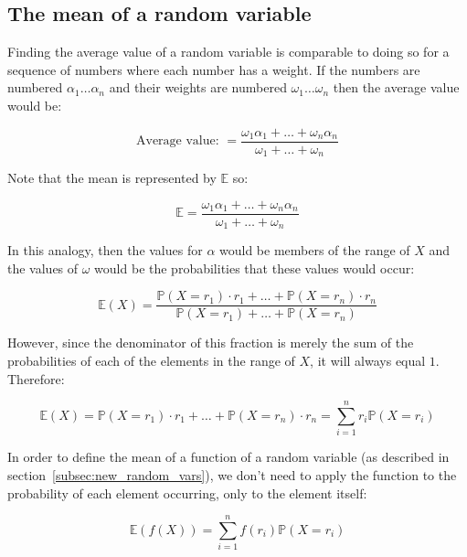 \subsection{The mean of a random variable}

Finding the average value of a random variable is comparable to doing so for a
sequence of numbers where each number has a weight. If the numbers are numbered
$\alpha_1 \dots \alpha_n$ and their weights are numbered $\omega_1 \dots
\omega_n$ then the average value would be:

\begin{dmath}
	\textrm{Average value: } = \frac{\omega_1\alpha_1 + \dots + \omega_n\alpha_n}{\omega_1 + \dots + \omega_n}
\end{dmath}

Note that the mean is represented by $\mathbb{E}$ so:

\begin{dmath}
	\mathbb{E} = \frac{\omega_1\alpha_1 + \dots + \omega_n\alpha_n}{\omega_1 + \dots + \omega_n}
\end{dmath}

In this analogy, then the values for $\alpha$ would be members of the range of
$X$ and the values of $\omega$ would be the probabilities that these values
would occur:

\begin{dmath}
	\mathbb{E}(X) = \frac{\mathbb{P}(X = r_1) \cdot r_1 + \dots + \mathbb{P}(X = r_n) \cdot r_n}{\mathbb{P}(X = r_1) + \dots + \mathbb{P}(X = r_n)}
\end{dmath}

However, since the denominator of this fraction is merely the sum of the
probabilities of each of the elements in the range of $X$, it will always equal
$1$. Therefore:

\begin{dmath}
	\mathbb{E}(X) = {\mathbb{P}(X = r_1) \cdot r_1 + \dots + \mathbb{P}(X = r_n) \cdot r_n} = {\sum\limits_{i=1}^{n} r_i \mathbb{P}(X = r_i)}
\end{dmath}

In order to define the mean of a function of a random variable (as described in
section~\ref{subsec:new_random_vars}), we don't need to apply the function to
the probability of each element occurring, only to the element itself:

\begin{dmath}
	\mathbb{E}(f(X)) = {\sum\limits_{i=1}^{n} f(r_i) \mathbb{P}(X = r_i)}
\end{dmath}

